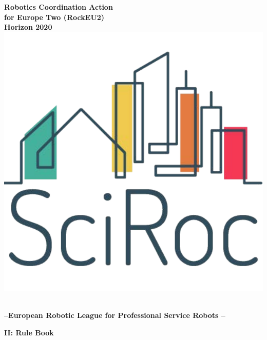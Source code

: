\begin{center}
	\textbf{\large 
 		Robotics Coordination Action\\ 
 		for Europe Two (RockEU2)\\
 		Horizon 2020\\
 		\includegraphics[scale=0.22]{./fig/logos/SciRoc-logo.pdf}
	}

	\vspace*{10mm}
	\hrulefill
	\vspace*{5mm}

	\textbf{%
		{\Huge \erlir}\\[1.5ex]
		{\Large --European Robotic League for Professional Service Robots  --}\\[1ex]
	}

	\hrulefill
	\vspace*{10mm}
\end{center}

\noindent\textbf{%
	{\Large II: \erlir Rule Book}\\[1ex]
}

